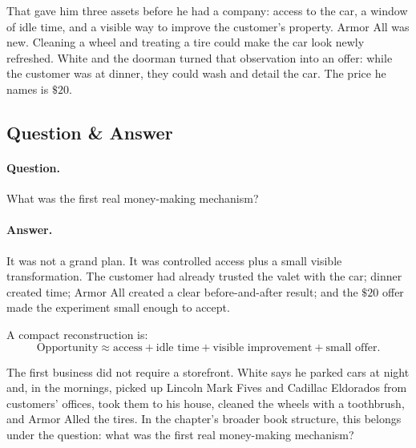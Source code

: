 That gave him three assets before he had a company: access to the car, a window of idle time, and a visible way to improve the customer's property. Armor All was new. Cleaning a wheel and treating a tire could make the car look newly refreshed. White and the doorman turned that observation into an offer: while the customer was at dinner, they could wash and detail the car. The price he names is \(\$20\).

\subsection{Question \& Answer}

\paragraph{Question.} What was the first real money-making mechanism?

\paragraph{Answer.} It was not a grand plan. It was controlled access plus a small visible transformation. The customer had already trusted the valet with the car; dinner created time; Armor All created a clear before-and-after result; and the \(\$20\) offer made the experiment small enough to accept.

A compact reconstruction is:
\begin{equation}
\text{Opportunity}
\approx
\text{access}
+
\text{idle time}
+
\text{visible improvement}
+
\text{small offer}.
\end{equation}

The first business did not require a storefront. White says he parked cars at night and, in the mornings, picked up Lincoln Mark Fives and Cadillac Eldorados from customers' offices, took them to his house, cleaned the wheels with a toothbrush, and Armor Alled the tires. In the chapter's broader book structure, this belongs under the question: what was the first real money-making mechanism?

